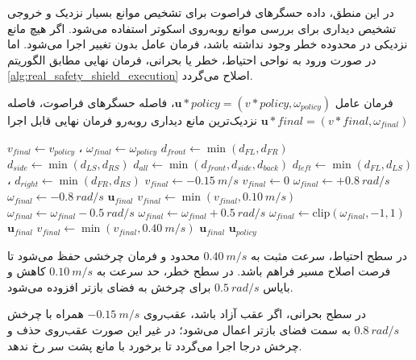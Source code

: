 در این منطق، داده حسگرهای فراصوت برای تشخیص موانع بسیار نزدیک و خروجی تشخیص دیداری برای بررسی موانع روبه‌روی اسکوتر استفاده می‌شود. اگر هیچ مانع نزدیکی در محدوده خطر وجود نداشته باشد، فرمان عامل بدون تغییر اجرا می‌شود. اما در صورت ورود به نواحی احتیاط، خطر یا بحرانی، فرمان نهایی مطابق الگوریتم \ref{alg:real_safety_shield_execution} اصلاح می‌گردد.
\begin{algorithm}[htb]
	\footnotesize
	\caption{اعمال سپر ایمنی فعال روی فرمان حرکتی عامل}
	\label{alg:real_safety_shield_execution}
	\begin{algorithmic}[1]
		\REQUIRE فرمان عامل $\mathbf{u}*{policy}=(v*{policy},\omega_{policy})$، فاصله حسگرهای فراصوت، فاصله نزدیک‌ترین مانع دیداری روبه‌رو
		\ENSURE فرمان نهایی قابل اجرا $\mathbf{u}*{final}=(v*{final},\omega_{final})$
		
		\STATE $v_{final}\gets v_{policy}$ ، $\omega_{final}\gets \omega_{policy}$
		\STATE $d_{front}\gets \min(d_{FL},d_{FR})$
		\STATE $d_{side}\gets \min(d_{LS},d_{RS})$
		\STATE $d_{all}\gets \min(d_{front},d_{side}, d_{back})$
		\STATE $d_{left}\gets \min(d_{FL},d_{LS})$ ، $d_{right}\gets \min(d_{FR},d_{RS})$
		\STATE $v_{final}\gets -0.15~m/s$
		\ELSE
		\STATE $v_{final}\gets 0$
		\ENDIF
		\STATE $\omega_{final}\gets +0.8~rad/s$
		\ELSE
		\STATE $\omega_{final}\gets -0.8~rad/s$
		\ENDIF
		\RETURN $\mathbf{u}_{final}$
		\ENDIF
		\STATE $v_{final}\gets \min(v_{final},0.10~m/s)$
		\STATE $\omega_{final}\gets \omega_{final}-0.5~rad/s$
		\ELSE
		\STATE $\omega_{final}\gets \omega_{final}+0.5~rad/s$
		\ENDIF
		\STATE $\omega_{final}\gets \mathrm{clip}(\omega_{final},-1,1)$
		\RETURN $\mathbf{u}_{final}$
		\ENDIF
		\STATE $v_{final}\gets \min(v_{final},0.40~m/s)$
		\RETURN $\mathbf{u}_{final}$
		\ENDIF
		\RETURN $\mathbf{u}_{policy}$ 
	\end{algorithmic}
	
\end{algorithm}

در سطح احتیاط، سرعت مثبت به $0.40~m/s$ محدود و فرمان چرخشی حفظ می‌شود تا فرصت اصلاح مسیر فراهم باشد. در سطح خطر، حد سرعت به $0.10~m/s$ کاهش و بایاس $0.5~rad/s$ برای چرخش به فضای بازتر افزوده می‌شود.

در سطح بحرانی، اگر عقب آزاد باشد، عقب‌روی $-0.15~m/s$ همراه با چرخش $0.8~rad/s$ به سمت فضای بازتر اعمال می‌شود؛ در غیر این صورت عقب‌روی حذف و چرخش درجا اجرا می‌گردد تا برخورد با مانع پشت سر رخ ندهد.

